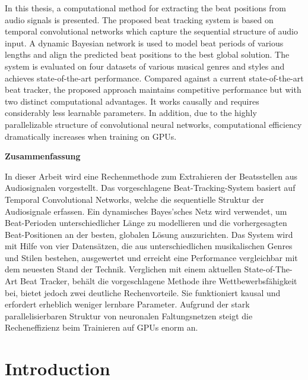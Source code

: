 \documentclass{scrartcl}
\begin{document}
In this thesis, a computational method for extracting the beat positions from audio signals is presented. The proposed beat tracking system is based on temporal con\-vo\-lu\-tional networks which capture the sequential structure of audio input. A dynamic Bayesian network is used to model beat periods of various lengths and align the predicted beat positions to the best global solution. The system is evaluated on four datasets of various musical  genres and styles and achieves state-of-the-art performance. Compared against a current state-of-the-art beat tracker, the proposed approach maintains competitive performance but with two distinct computational advantages. It works cau\-sally and requires considerably less learnable parameters. In addition, due to the highly parallelizable structure of convolutional neural networks, computational efficiency dramatically increases when training on GPUs.


\vspace{13em}

\begin{center} 
\textsf{\textbf{Zusammenfassung}}
\end{center}

In dieser Arbeit wird eine Rechenmethode zum Extrahieren der Beatsstellen aus Audiosignalen vorgestellt. Das vorgeschlagene Beat-Tracking-System basiert auf Temporal Convolutional Networks, welche die sequentielle Struktur der Audiosignale erfassen. Ein dynamisches Bayes'sches Netz wird verwendet, um Beat-Perioden unterschiedlicher Länge zu modellieren und die vorhergesagten Beat-Positionen an der besten, globalen Lösung auszurichten. Das System wird mit Hilfe von vier Datensätzen, die aus unterschiedlichen musikalischen Genres und Stilen bestehen, ausgewertet und erreicht eine Performance vergleichbar mit dem neuesten Stand der Technik. Verglichen mit einem aktuellen State-of-The-Art Beat Tracker, behält die vorgeschlagene Methode ihre Wettbewerbsfähigkeit bei, bietet jedoch zwei deutliche Rechenvorteile. Sie funktioniert kausal und erfordert erheblich weniger lernbare Parameter. Aufgrund der stark parallelisierbaren Struktur von neuronalen Faltungsnetzen steigt die Recheneffizienz beim Trainieren auf GPUs enorm an.




\newpage

\tableofcontents
\newpage


\section{Introduction}
\label{sec:introduction}
\end{document}
